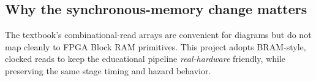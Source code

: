 \subsection{Why the synchronous-memory change matters}
The textbook's combinational-read arrays are convenient for diagrams but do not
map cleanly to FPGA Block RAM primitives. This project adopts BRAM-style,
clocked reads to keep the educational pipeline \emph{real-hardware} friendly,
while preserving the same stage timing and hazard behavior.
